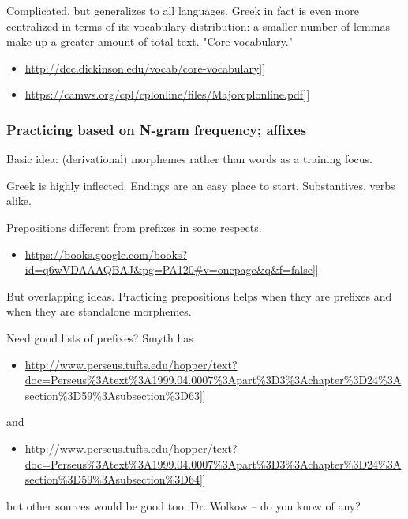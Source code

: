 \documentclass[11pt]{article}
\begin{document}
Complicated, but generalizes to all languages. Greek in fact is even more centralized in terms of its vocabulary distribution: a smaller number of lemmas make up a greater amount of total text. "Core vocabulary."

\begin{itemize}
\item \url{http://dcc.dickinson.edu/vocab/core-vocabulary}]]
\item \url{https://camws.org/cpl/cplonline/files/Majorcplonline.pdf}]]
\end{itemize}

\subsubsection{Practicing based on N-gram frequency; affixes}
\label{sec:org6c36a23}

Basic idea: (derivational) morphemes rather than words as a training focus.

Greek is highly inflected. Endings are an easy place to start. Substantives, verbs alike.

Prepositions different from prefixes in some respects.

\begin{itemize}
\item \url{https://books.google.com/books?id=q6wVDAAAQBAJ\&pg=PA120\#v=onepage\&q\&f=false}]]
\end{itemize}

But overlapping ideas. Practicing prepositions helps when they are prefixes and when they are standalone morphemes.

Need good lists of prefixes? Smyth has 

\begin{itemize}
\item \url{http://www.perseus.tufts.edu/hopper/text?doc=Perseus\%3Atext\%3A1999.04.0007\%3Apart\%3D3\%3Achapter\%3D24\%3Asection\%3D59\%3Asubsection\%3D63}]]
\end{itemize}

and 

\begin{itemize}
\item \url{http://www.perseus.tufts.edu/hopper/text?doc=Perseus\%3Atext\%3A1999.04.0007\%3Apart\%3D3\%3Achapter\%3D24\%3Asection\%3D59\%3Asubsection\%3D64}]]
\end{itemize}

but other sources would be good too. Dr. Wolkow -- do you know of any?
\end{document}
